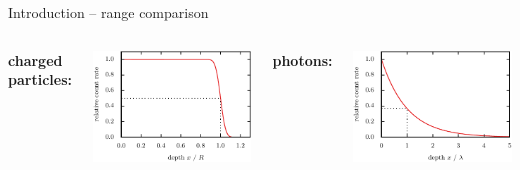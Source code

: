 \documentclass[11pt,xcolor=dvipsnames,professionalfonts,notes]{beamer}
\begin{document}
\begin{frame}{Introduction -- range comparison}
	
	\begin{columns}
		\centering
		\hspace{1cm}\textbf{charged particles:}
		
		\vspace{0.5cm}
		
		\includegraphics[width=1.0\textwidth]{./figures/range.pdf}
		
		\centering
		\hspace{1cm}\textbf{photons:}
		
		\vspace{0.5cm}
		
		\includegraphics[width=1.0\textwidth]{./figures/lambert_beer_exp.pdf}
		
	\end{columns}
\end{frame}
\end{document}

